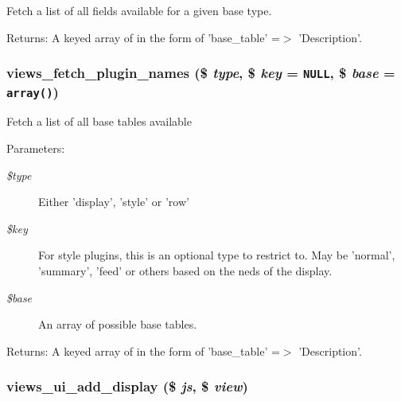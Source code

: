 Fetch a list of all fields available for a given base type.

\begin{Desc}
\item[Returns:]A keyed array of in the form of 'base\_\-table' =$>$ 'Description'. \end{Desc}
\hypertarget{admin_8inc_e7963b102753500f8de139bf60d59ca5}{
\subsubsection[{views\_\-fetch\_\-plugin\_\-names}]{\setlength{\rightskip}{0pt plus 5cm}views\_\-fetch\_\-plugin\_\-names (\$ {\em type}, \/  \$ {\em key} = {\tt NULL}, \/  \$ {\em base} = {\tt array()})}}
\label{admin_8inc_e7963b102753500f8de139bf60d59ca5}


Fetch a list of all base tables available

\begin{Desc}
\item[Parameters:]
\begin{description}
\item[{\em \$type}]Either 'display', 'style' or 'row' \item[{\em \$key}]For style plugins, this is an optional type to restrict to. May be 'normal', 'summary', 'feed' or others based on the neds of the display. \item[{\em \$base}]An array of possible base tables.\end{description}
\end{Desc}
\begin{Desc}
\item[Returns:]A keyed array of in the form of 'base\_\-table' =$>$ 'Description'. \end{Desc}
\hypertarget{admin_8inc_a873e68cc2b1ed40f04cf5b8653f0973}{
\subsubsection[{views\_\-ui\_\-add\_\-display}]{\setlength{\rightskip}{0pt plus 5cm}views\_\-ui\_\-add\_\-display (\$ {\em js}, \/  \$ {\em view})}}
\label{admin_8inc_a873e68cc2b1ed40f04cf5b8653f0973}


